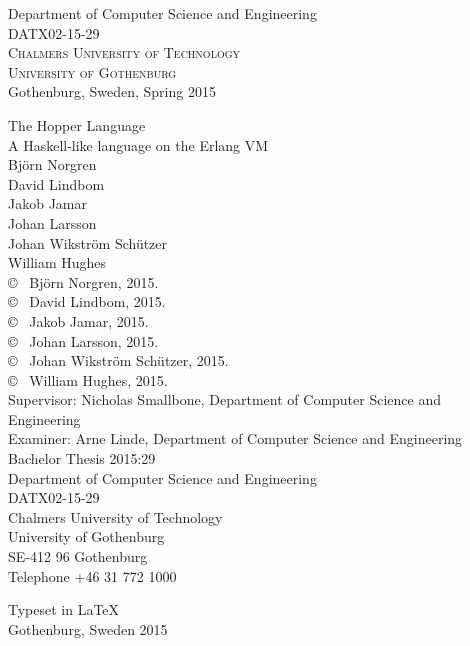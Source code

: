 \begin{center}
	Department of Computer Science and Engineering \\
	DATX02-15-29\\
	\textsc{Chalmers University of Technology} \\
	\textsc{University of Gothenburg} \\
	Gothenburg, Sweden, Spring 2015 \\
\end{center}


\newpage
\thispagestyle{plain}
\vspace*{4.5cm}
The Hopper Language\\
A Haskell-like language on the Erlang VM\\
Björn Norgren\\
David Lindbom\\
Jakob Jamar\\
Johan Larsson\\
Johan Wikström Schützer\\
William Hughes\\[0.5cm]

\copyright ~ Björn Norgren, 2015.\\
\copyright ~ David Lindbom, 2015.\\
\copyright ~ Jakob Jamar, 2015.\\
\copyright ~ Johan Larsson, 2015.\\
\copyright ~ Johan Wikström Schützer, 2015.\\
\copyright ~ William Hughes, 2015.\\[0.5cm]

Supervisor: Nicholas Smallbone, Department of Computer Science and Engineering\\
Examiner: Arne Linde, Department of Computer Science and Engineering\\[0.5cm]

Bachelor Thesis 2015:29\\
Department of Computer Science and Engineering\\
DATX02-15-29\\
Chalmers University of Technology\\
University of Gothenburg\\
SE-412 96 Gothenburg\\
Telephone +46 31 772 1000\\

\vfill

Typeset in \LaTeX \\
Gothenburg, Sweden 2015
